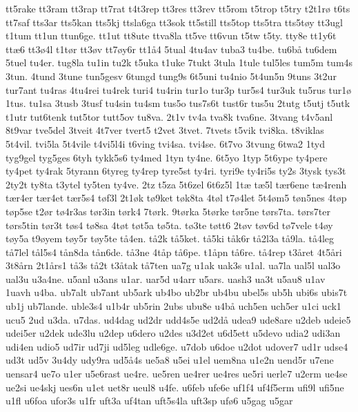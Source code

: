 tt5rake
tt3ram
tt3rap
tt7rat
t4t3rep
tt3res
tt3rev
tt5rom
t5trop
t5try
t2t1r^^f8
t6ts
tt7saf
tts3ar
tts5kan
tts5kj
ttsla6ga
tt3sok
tt5still
tts5top
tts5tra
tts5t^^f8y
tt3ugl
t1tum
tt1un
ttun6ge.
tt1ut
tt8ute
ttva8la
tt5ve
tt6vun
t5tw
t5ty.
tty8e
tt1y6t
tt^^e66
tt3^^f84l
t1t^^f8r
tt3^^f8v
tt7^^f8y6r
tt1^^e54
5tual
4tu4av
tuba3
tu4be.
tu6b^^e5
tu6dem
5tuel
tu4er.
tug8la
tu1in
tu2k
t5uka
t1uke
7tukt
3tula
1tule
tul5les
tum5m
tum4s
3tun.
4tund
3tune
tun5gesv
6tungd
tung9s
6t5uni
tu4nio
5t4un5n
9tuns
3t2ur
tur7ant
tu4ras
4tu4rei
tu4rek
turi4
tu4rin
tur1o
tur3p
tur5s4
tur3uk
tu5rus
tur1^^f8
1tus.
tu1sa
3tusb
3tusf
tu4sin
tu4sm
tus5o
tus7s6t
tust6r
tus5u
2tutg
t5utj
t5utk
t1utr
tut6tenk
tut5tor
tutt5ov
tu8va.
2t1v
tv4a
tva8k
tva6ne.
3tvang
t4v5anl
8t9var
tve5del
3tveit
4t7ver
tvert5
t2vet
3tvet.
7tvets
t5vik
tvi8ka.
t8viklas
5t4vil.
tvi5la
5t4vile
t4vi5l4i
t6ving
tvi4sa.
tvi4se.
6t7vo
3tvung
6twa2
1tyd
tyg9gel
tyg5ges
6tyh
tykk5s6
ty4med
1tyn
ty4ne.
6t5yo
1typ
5t6ype
ty4pere
ty4pet
ty4rak
5tyrann
6tyreg
ty4rep
tyre5st
ty4ri.
tyri9e
ty4ri5s
ty2s
3tysk
tys3t
2ty2t
ty8ta
t3ytel
ty5ten
ty4ve.
2tz
t5za
5t6zel
6t6z5l
1t^^e6
t^^e65l
t^^e6r6ene
t^^e64renh
t^^e6r4er
t^^e6r4et
t^^e6r5s4
t^^f8f3l
2t1^^f8k
t^^f89ket
t^^f8k8ta
4t^^f8l
t7^^f84let
5t4^^f8m5
t^^f8n5nes
4t^^f8p
t^^f8p5se
t2^^f8r
t^^f84r3as
t^^f8r3in
t^^f8rk4
7t^^f8rk.
9t^^f8rka
5t^^f8rke
t^^f8r5ne
t^^f8rs7ta.
t^^f8rs7ter
t^^f8rs5tin
t^^f8r3t
t^^f8s4
t^^f88sa
4t^^f8t
t^^f8t5a
t^^f85ta.
t^^f83te
t^^f8tt6
2t^^f8v
t^^f8v6d
t^^f87vele
t4^^f8y
t^^f8y5a
t9^^f8yem
t^^f8y5r
t^^f8y5te
t^^e54en.
t^^e52k
t^^e55ket.
t^^e55ki
t^^e5k6r
t^^e52l3a
t^^e59la.
t^^e54leg
t^^e57lel
t^^e5l5s4
t^^e5n8da
t^^e5n6de.
t^^e53ne
4t^^e5p
t^^e56pe.
t1^^e5pn
t^^e56re.
t^^e54rep
t3^^e5ret
4t5^^e5ri
3t8^^e5rn
2t1^^e5rs1
t^^e53s
t^^e52t
t3^^e5tak
t^^e57ten
ua7g
u1ak
uak3s
u1al.
ua7la
ual5l
ual3o
ual3u
u3a4ne.
u5anl
u3ans
u1ar.
uar5d
u4arr
u5ars.
uash3
ua3t
u5au8
u1av
1uavh
u4ba.
ub7alt
ub7ant
ub5ark
ub4bo
ub2br
ub4bu
ubel5s
ub5h
ubi6s
ubis7t
ub1j
ub7lande.
uble3s4
u1b4r
ub5rin
2ubs
ubu8e
u4b^^e5
uch5en
uch5er
u1ci
uck1
ucu5
2ud
u3da.
u7das.
ud4dag
ud2dr
udd4s5e
ud2d^^e5
udea9
ude8are
u2deb
udeie5
udei5er
u2dek
ude3lu
u2dep
u6dero
u2des
u3d2et
u6d5ett
u5devo
udia2
udi3an
udi4en
udio5
ud7ir
ud7ji
ud5leg
udle6ge.
u7dob
u6doe
u2dot
udover7
ud1r
udse4
ud3t
ud5v
3u4dy
udy9ra
ud5^^e54s
ue5a8
u5ei
u1el
uem8na
u1e2n
uend5r
u7ene
uensar4
ue7o
u1er
u5e6rast
ue4re.
ue5ren
ue4rer
ue4res
ue5ri
uerle7
u2erm
ue4se
ue2si
ue4skj
ues6n
u1et
uet8r
ueul8
u4fe.
u6feb
ufe6e
uf1f4
uf4f5erm
ufi9l
ufi5ne
u1fl
u6foa
ufor3s
u1fr
uft3a
uf4tan
uft5s4la
uft3sp
uf^^f86
u5gag
u5gar
